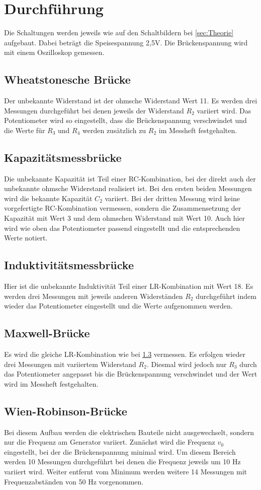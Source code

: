 \section{Durchführung}
\label{sec:Durchführung}

Die Schaltungen werden jeweils wie auf den Schaltbildern bei 
\ref{sec:Theorie} aufgebaut. Dabei beträgt die
Speisespannung 2,5V. Die Brückenspannung wird
mit einem Oszilloskop gemessen.
\subsection{Wheatstonesche Brücke}
Der unbekannte Widerstand ist der ohmsche Widerstand Wert 11.
Es werden drei Messungen durchgeführt bei denen jeweils der Widerstand $R_2$
variiert wird. Das Potentiometer wird so eingestellt,
dass die Brückenspannung verschwindet und die Werte
für $R_3$ und $R_4$ werden zusätzlich zu $R_2$ im Messheft festgehalten.
\subsection{Kapazitätsmessbrücke}
Die unbekannte Kapazität ist Teil einer RC-Kombination,
bei der direkt auch der unbekannte ohmsche Widerstand realisiert ist.
Bei den ersten beiden Messungen wird die bekannte Kapazität $C_2$ variiert.
Bei der dritten Messung wird keine vorgefertigte RC-Kombination vermessen, sondern die 
Zusammensetzung der Kapazität mit Wert 3 und dem ohmschen Widerstand mit Wert 10.
Auch hier wird wie oben das Potentiometer passend eingestellt und die
entsprechenden Werte notiert.
\subsection{Induktivitätsmessbrücke}
\label{sec:Indu}
Hier ist die unbekannte Induktivität Teil einer LR-Kombination
mit Wert 18. Es werden drei Messungen mit jeweils anderen Widerständen $R_2$
durchgeführt indem wieder das Potentiometer eingestellt und die Werte aufgenommen werden.
\subsection{Maxwell-Brücke}
Es wird die gleiche LR-Kombination wie bei \ref{sec:Indu} vermessen.
Es erfolgen wieder drei Messungen mit variiertem Widerstand $R_2$. Diesmal
wird jedoch nur $R_3$ durch das Potentiometer angepasst bis die
Brückenspannung verschwindet und der Wert wird im Messheft festgehalten.

\subsection{Wien-Robinson-Brücke}
Bei diesem Aufbau werden die elektrischen Bauteile
nicht ausgewechselt, sondern nur die Frequenz am 
Generator variiert. Zunächst wird die Frequenz $v_0$ eingestellt,
bei der die Brückenspannung minimal wird. Um diesem Bereich werden
10 Messungen durchgeführt bei denen die Frequenz jeweils um 10 Hz
variiert wird. Weiter entfernt vom Minimum werden weitere 14 Messungen
mit Frequenzabständen von 50 Hz vorgenommen.

